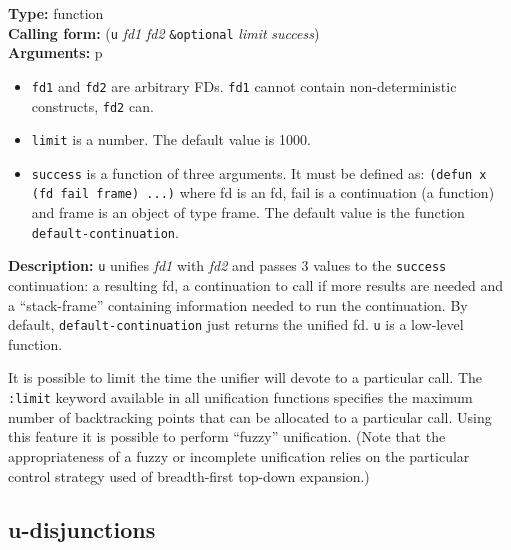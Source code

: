 \documentclass[10pt,a4paper]{report}
\begin{document}
{\bf Type:} function
\\{\bf Calling form:} ({\tt u} {\em fd1} {\em fd2} {\tt \&optional} {\em limit} {\em success})
\\{\bf Arguments:} 
p\begin{itemize}
\item {\tt fd1} and {\tt fd2} are arbitrary FDs.  {\tt fd1} cannot contain
non-deterministic constructs, {\tt fd2} can.

\item {\tt limit} is a number.  The default value is 1000.

\item {\tt success} is a function of three arguments. It must be defined as:
{\tt (defun x (fd fail frame) ...)} where fd is an fd, fail is a continuation
(a function) and frame is an object of type frame.  The default value is
the function {\tt default-continuation}.
\end{itemize}

{\bf Description:} {\tt u} unifies {\em fd1} with {\em fd2} and passes 3 values
to the {\tt success} continuation: a resulting fd, a continuation to call if
more results are needed and a ``stack-frame'' containing information needed
to run the continuation.  By default, {\tt default-continuation} just returns
the unified fd.  {\tt u} is a low-level function.  

It is possible to limit the time the unifier will devote to a particular
call.  The {\tt :limit} keyword available in all unification functions specifies
the maximum number of backtracking points that can be allocated to a
particular call.  Using this feature it is possible to perform ``fuzzy''
unification.  (Note that the appropriateness of a fuzzy or incomplete
unification relies on the particular control strategy used of breadth-first
top-down expansion.)

\subsection{u-disjunctions}
\end{document}
